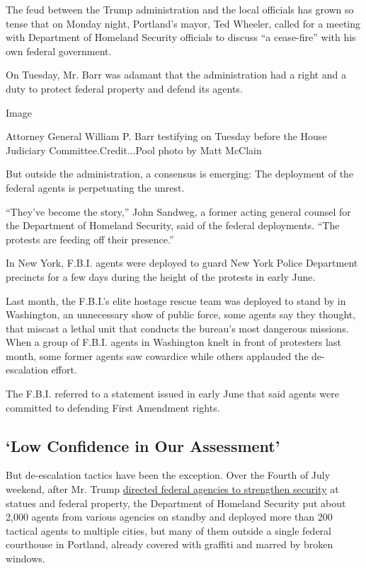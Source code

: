 The feud between the Trump administration and the local officials has
grown so tense that on Monday night, Portland's mayor, Ted Wheeler,
called for a meeting with Department of Homeland Security officials to
discuss ``a cease-fire'' with his own federal government.

On Tuesday, Mr. Barr was adamant that the administration had a right and
a duty to protect federal property and defend its agents.

Image

Attorney General William P. Barr testifying on Tuesday before the House
Judiciary Committee.Credit...Pool photo by Matt McClain

But outside the administration, a consensus is emerging: The deployment
of the federal agents is perpetuating the unrest.

``They've become the story,'' John Sandweg, a former acting general
counsel for the Department of Homeland Security, said of the federal
deployments. ``The protests are feeding off their presence.''

In New York, F.B.I. agents were deployed to guard New York Police
Department precincts for a few days during the height of the protests in
early June.

Last month, the F.B.I.'s elite hostage rescue team was deployed to stand
by in Washington, an unnecessary show of public force, some agents say
they thought, that miscast a lethal unit that conducts the bureau's most
dangerous missions. When a group of F.B.I. agents in Washington knelt in
front of protesters last month, some former agents saw cowardice while
others applauded the de-escalation effort.

The F.B.I. referred to a statement issued in early June that said agents
were committed to defending First Amendment rights.

\hypertarget{low-confidence-in-our-assessment}{%
\subsection{`Low Confidence in Our
Assessment'}\label{low-confidence-in-our-assessment}}

But de-escalation tactics have been the exception. Over the Fourth of
July weekend, after Mr. Trump
\href{https://www.nytimes3xbfgragh.onion/2020/06/26/us/politics/trump-monuments-executive-order.html}{directed
federal agencies to strengthen security} at statues and federal
property, the Department of Homeland Security put about 2,000 agents
from various agencies on standby and deployed more than 200 tactical
agents to multiple cities, but many of them outside a single federal
courthouse in Portland, already covered with graffiti and marred by
broken windows.


